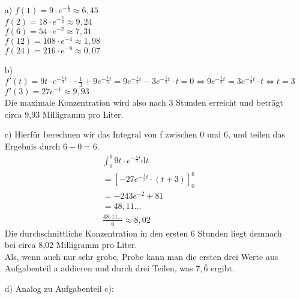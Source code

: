 \documentclass[a4paper,11pt]{article}
\begin{document}
\begin{enumerate}
            \begin{enumerate}
                \item[a)]
                    \(f(1)=9 \cdot e^{-\frac{1}{3}} \approx 6,45\)\\
                    \(f(2)=18 \cdot e^{-\frac{2}{3}} \approx 9,24\)\\
                    \(f(6)=54 \cdot e^{-2} \approx 7,31\)\\
                    \(f(12)=108 \cdot e^{-4} \approx 1,98\)\\
                    \(f(24)=216 \cdot e^{-8} \approx 0,07\)\\
                \item[b)]
                    \( f'(t)= 9t \cdot e^{-\frac{1}{3}t} \cdot -\frac{1}{3} + 9e^{-\frac{1}{3}t} = 9e^{-\frac{1}{3}t} - 3e^{-\frac{1}{3}t} \cdot t
                    = 0 \Leftrightarrow 9e^{-\frac{1}{3}t} = 3e^{-\frac{1}{3}t} \cdot t \Leftrightarrow t=3 \)\\
                    \( f'(3)=27e^{-1} \approx 9,93 \)\\
                    Die maximale Konzentration wird also nach 3 Stunden erreicht und beträgt circa 9,93 Milligramm pro Liter.
                \item[c)]
                    Hierfür berechnen wir das Integral von f zwischen 0 und 6, und teilen das Ergebnis durch $6-0=6$.\\
                    \begin{align*}
                        \int_0^6 9t \cdot e^{-\frac{1}{3}t} \mathrm{d}t\\
                        = [-27 e^{-\frac{1}{3}t} \cdot (t+3)]_0^6\\
                        = -243 e^{-2} + 81\\
                        = 48,11... \\
                        \frac{48,11...}{6} \approx 8,02
                    \end{align*}
                    Die durchschnittliche Konzentration in den ersten 6 Stunden liegt demnach bei circa 8,02 Milligramm pro Liter.\\
                    Als, wenn auch nur sehr grobe, Probe kann man die ersten drei Werte aus Aufgabenteil a addieren und durch drei Teilen,
                    was $7, \overline{6}$ ergibt.
                \item[d)]
                    Analog zu Aufgabenteil c):\\
                    \begin{align*}

\end{align*}
\end{enumerate}
\end{enumerate}
\end{document}

